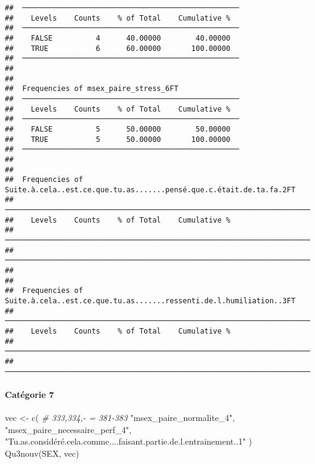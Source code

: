 \documentclass[
]{article}
\newenvironment{Shaded}{\begin{snugshade}}{\end{snugshade}}
\newcommand{\CommentTok}[1]{\textcolor[rgb]{0.56,0.35,0.01}{\textit{#1}}}
\newcommand{\FunctionTok}[1]{\textcolor[rgb]{0.00,0.00,0.00}{#1}}
\newcommand{\NormalTok}[1]{#1}
\newcommand{\OtherTok}[1]{\textcolor[rgb]{0.56,0.35,0.01}{#1}}
\newcommand{\StringTok}[1]{\textcolor[rgb]{0.31,0.60,0.02}{#1}}
\begin{document}
\begin{verbatim}
##  ────────────────────────────────────────────────── 
##    Levels    Counts    % of Total    Cumulative %   
##  ────────────────────────────────────────────────── 
##    FALSE          4      40.00000        40.00000   
##    TRUE           6      60.00000       100.00000   
##  ────────────────────────────────────────────────── 
## 
## 
##  Frequencies of msex_paire_stress_6FT               
##  ────────────────────────────────────────────────── 
##    Levels    Counts    % of Total    Cumulative %   
##  ────────────────────────────────────────────────── 
##    FALSE          5      50.00000        50.00000   
##    TRUE           5      50.00000       100.00000   
##  ────────────────────────────────────────────────── 
## 
## 
##  Frequencies of Suite.à.cela..est.ce.que.tu.as.......pensé.que.c.était.de.ta.fa.2FT 
##  ────────────────────────────────────────────────────────────────────────────────── 
##    Levels    Counts    % of Total    Cumulative %   
##  ────────────────────────────────────────────────────────────────────────────────── 
##  ────────────────────────────────────────────────────────────────────────────────── 
## 
## 
##  Frequencies of Suite.à.cela..est.ce.que.tu.as.......ressenti.de.l.humiliation..3FT 
##  ────────────────────────────────────────────────────────────────────────────────── 
##    Levels    Counts    % of Total    Cumulative %   
##  ────────────────────────────────────────────────────────────────────────────────── 
##  ──────────────────────────────────────────────────────────────────────────────────
\end{verbatim}

\hypertarget{catuxe9gorie-7}{%
\paragraph{Catégorie 7}\label{catuxe9gorie-7}}

\begin{Shaded}
\begin{Highlighting}[]
\NormalTok{vec }\OtherTok{\textless{}{-}} \FunctionTok{c}\NormalTok{(  }\CommentTok{\# 333,334,{-} = 381{-}383}
  \StringTok{"msex\_paire\_normalite\_4"}\NormalTok{,}
  \StringTok{"msex\_paire\_necessaire\_perf\_4"}\NormalTok{,}
  \StringTok{"Tu.as.considéré.cela.comme....faisant.partie.de.l.entrainement..1"}
\NormalTok{)}
\FunctionTok{Qu3nouv}\NormalTok{(SEX, vec)}
\end{Highlighting}
\end{Shaded}
\end{document}
